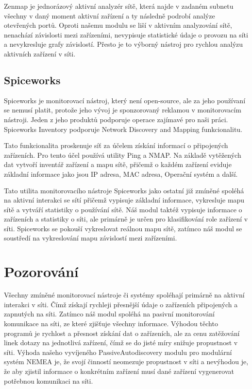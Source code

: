 \documentclass[thesis=B,czech,hidelinks]{FITthesis}[2019/03/21]
\begin{document}
        Zenmap \cite{Zenmap} je jednorázový aktivní analyzér sítě, která najde v zadaném subnetu všechny v daný moment aktivní zařízení a ty následně podrobí analýze otevřených portů. Oproti našemu modulu se liší v aktivním analyzování sítě, nenachází závislosti mezi zařízeními, nevypisuje statistické údaje o provozu na síti a nevykresluje grafy závislostí. Přesto je to výborný nástroj pro rychlou analýzu aktivních zařízení v síti.
        
        \subsection{Spiceworks}
        Spiceworks \cite{Spiceworks} je monitorovací nástroj, který není open-source, ale za jeho používaní se nemusí platit, protože jeho vývoj je sponzorovaný reklamou v monitorovacím nástroji. Jeden z jeho produktů podporuje operace zajímavé pro naši práci. Spiceworks Inventory podporuje Network Discovery and Mapping funkcionalitu. 
        
        Tato funkcionalita proskenuje síť za účelem získání informací o připojených zařízeních. Pro tento účel používá utility Ping a NMAP. Na základě vytěžených dat vytvoří inventář zařízení a mapu sítě, přičemž o každém zařízení eviduje základní informace jako jsou IP adresa, MAC adresa, Operační systém a další. 
        
        Tato utilita monitorovacího nástroje Spiceworks jako ostatní již zmíněné spoléhá na aktivní interakci se sítí přičemž vypisuje základní informace, vykresluje mapu sítě a vytváří statistiky o používání sítě. Náš modul taktéž vypisuje informace o zařízeních a statistiky o síti, ale primárně je určen pro klasifikování role zařízení v síti. Spiceworks se pokouší vykreslovat reálnou mapu sítě, zatímco náš modul se soustředí na vykreslování mapu závislostí mezi zařízeními.
        
    \section{Pozorování}
    Všechny zmíněné monitorovací nástroje či systémy spoléhají primárně na aktivní interakci v síti. Čímž získají rychleji přesnější údaje o zařízeních připojených a zapnutých na síti. Zatímco náš modul spoléhá na pasivní monitorování komunikace na síti, ze které zjišťuje všechny informace. Výhodou těchto programů je rychlost a přesnost získání dat o zařízeních, ale za cenu zatěžování linek dotazy na jednotlivá zařízení, čímž se do jisté míry snižuje propustnost v síti. Výhoda našeho vyvíjeného PassiveAutodiscovery modulu pro modulární systém NEMEA je, že svojí činností neomezuje propustnost v síti a nevýhodou je, že aby zjistil informace o konkrétním zařízení musí dané zařízení vygenerovat potřebnou komunikaci na síti. 
        
\end{document}
